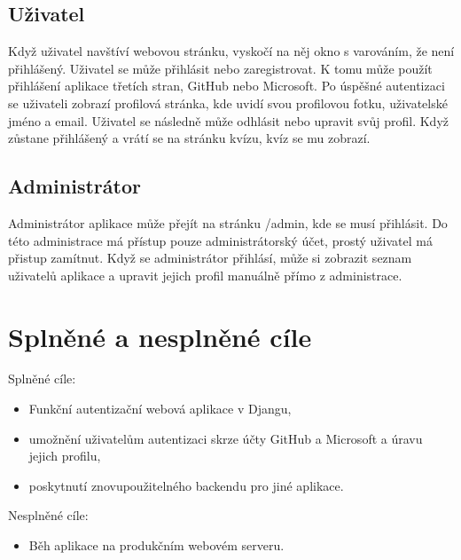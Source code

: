 \documentclass[12pt, a4paper,
twoside,        %
openright
]{report}
\begin{document}
\subsection{Uživatel}
Když uživatel navštíví webovou stránku, vyskočí na něj okno s varováním, že není přihlášený. Uživatel se může přihlásit nebo zaregistrovat. K tomu může použít přihlášení aplikace třetích stran, GitHub nebo Microsoft. Po úspěšné autentizaci se uživateli zobrazí profilová stránka, kde uvidí svou profilovou fotku, uživatelské jméno a email. Uživatel se následně může odhlásit nebo upravit svůj profil. Když zůstane přihlášený a vrátí se na stránku kvízu, kvíz se mu zobrazí.
\subsection{Administrátor}
Administrátor aplikace může přejít na stránku /admin, kde se musí přihlásit. Do této administrace má přístup pouze administrátorský účet, prostý uživatel má přistup zamítnut. Když se administrátor přihlásí, může si zobrazit seznam uživatelů aplikace a upravit jejich profil manuálně přímo z administrace.
\section{Splněné a nesplněné cíle}
\label{sec:cile}
Splněné cíle:
\begin{itemize}
	\item Funkční autentizační webová aplikace v Djangu,
	\item umožnění uživatelům autentizaci skrze účty GitHub a Microsoft a úravu jejich profilu,
	\item  poskytnutí znovupoužitelného backendu pro jiné aplikace.
\end{itemize}
Nesplněné cíle:
\begin{itemize}
	\item Běh aplikace na produkčním webovém serveru.
\end{itemize}
\end{document}
